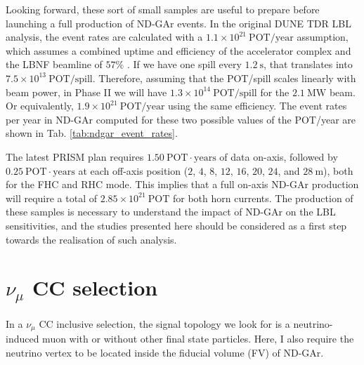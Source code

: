 Looking forward, these sort of small samples are useful to prepare before launching a full production of ND-GAr events. In the original DUNE TDR LBL analysis, the event rates are calculated with a $1.1 \times 10^{21} ~ \mathrm{POT}/\mathrm{year}$ assumption, which assumes a combined uptime and efficiency of the accelerator complex and the LBNF beamline of $57\%$ \cite{DUNE2020}. If we have one spill every $1.2~\mathrm{s}$, that translates into $7.5 \times 10^{13} ~ \mathrm{POT}/\mathrm{spill}$. Therefore, assuming that the POT/spill scales linearly with beam power, in Phase II we will have $1.3 \times 10^{14} ~ \mathrm{POT}/\mathrm{spill}$ for the $2.1 ~ \mathrm{MW}$ beam. Or equivalently, $1.9 \times 10^{21} ~ \mathrm{POT}/\mathrm{year}$ using the same efficiency. The event rates per year in ND-GAr computed for these two possible values of the POT/year are shown in Tab. \ref{tab:ndgar_event_rates}.

The latest PRISM plan requires $1.50 ~ \mathrm{POT} \cdot \mathrm{years}$ of data on-axis, followed by $0.25 ~ \mathrm{POT} \cdot \mathrm{years}$ at each off-axis position ($2$, $4$, $8$, $12$, $16$, $20$, $24$, and $28~\mathrm{m}$), both for the FHC and RHC mode. This implies that a full on-axis ND-GAr production will require a total of $2.85 \times 10^{21}~\mathrm{POT}$ for both horn currents. The production of these samples is necessary to understand the impact of ND-GAr on the LBL sensitivities, and the studies presented here should be considered as a first step towards the realisation of such analysis.

\section[\texorpdfstring{$\nu_{\mu}$}{numu} CC selection]{\boldmath\texorpdfstring{$\nu_{\mu}$}{numu} CC selection}
\label{sec:gar_numu_cc}

In a $\nu_{\mu}$ CC inclusive selection, the signal topology we look for is a neutrino-induced muon with or without other final state particles. Here, I also require the neutrino vertex to be located inside the fiducial volume (FV) of ND-GAr.

